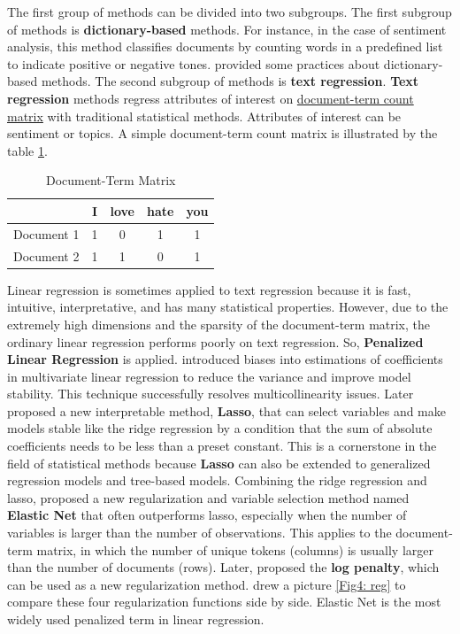 \documentclass[aoas]{imsart}
\numberwithin{equation}{section}
\theoremstyle{plain}
\theoremstyle{remark}
\begin{document}
The first group of methods can be divided into two subgroups. The first subgroup of methods is \textbf{dictionary-based} methods. For instance, in the case of sentiment analysis, this method classifies documents by counting words in a predefined list to indicate positive or negative tones. \cite{dic} provided some practices about dictionary-based methods. The second subgroup of methods is \textbf{text regression}. \textbf{Text regression} methods regress attributes of interest on  \href{https://en.wikipedia.org/wiki/Document-term_matrix}{document-term count matrix} with traditional statistical methods. Attributes of interest can be sentiment or topics. A simple document-term count matrix is illustrated by the table \ref{tab:doc}.
\begin{table}[ht]
    \centering
    \begin{tabular}{|c|c|c|c|c|} \hline 
         &  I&  love&  hate& you\\ \hline 
         Document 1&  1&  0&  1& 1\\ \hline 
         Document 2&  1&  1&  0& 1\\ \hline
    \end{tabular}
    \caption{Document-Term Matrix}
    \label{tab:doc}
\end{table}
Linear regression is sometimes applied to text regression because it is fast, intuitive, interpretative, and has many statistical properties. However, due to the extremely high dimensions and the sparsity of the document-term matrix, the ordinary linear regression performs poorly on text regression. So, \textbf{Penalized Linear Regression} is applied. \cite{a92f3c16-7c6e-31d3-b403-82d2b0a469e4} introduced biases into estimations of coefficients in multivariate linear regression to reduce the variance and improve model stability. This technique successfully resolves multicollinearity issues. Later \cite{51791361-8fe2-38d5-959f-ae8d048b490d} proposed a new interpretable method, \textbf{Lasso}, that can select variables and make models stable like the ridge regression by a condition that the sum of absolute coefficients needs to be less than a preset constant. This is a cornerstone in the field of statistical methods because \textbf{Lasso} can also be extended to generalized regression models and tree-based models. Combining the ridge regression and lasso, \cite{b61d584f-9c9c-3cf8-b866-214ec2216250} proposed a new regularization and variable selection method named \textbf{Elastic Net} that often outperforms lasso, especially when the number of variables is larger than the number of observations. This applies to the document-term matrix, in which the number of unique tokens (columns) is usually larger than the number of documents (rows). Later, \cite{log} proposed the \textbf{log penalty}, which can be used as a new regularization method. \cite{10.1257/jel.20181020} drew a picture \ref{Fig4: reg} to compare these four regularization functions side by side. Elastic Net is the most widely used penalized term in linear regression.
\end{document}
